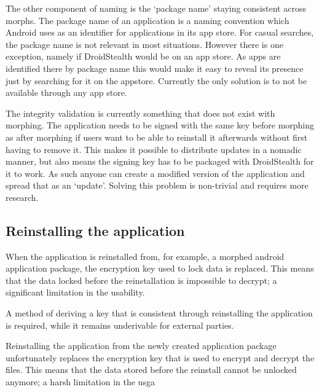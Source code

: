 The other component of naming is the `package name' staying consistent across morphs. 
The package name of an application is a naming convention which Android uses as an identifier for applications in its app store.
For casual searches, the package name is not relevant in most situations.
However there is one exception, namely if DroidStealth would be on an app store. 
As apps are identified there by package name this would make it easy to reveal its presence just by searching for it on the appstore.
Currently the only solution is to not be available through any app store.

The integrity validation is currently something that does not exist with morphing. 
The application needs to be signed with the same key before morphing as after morphing if users want to be able to reinstall it afterwards without first having to remove it. 
This makes it possible to distribute updates in a nomadic manner, but also means the signing key has to be packaged with DroidStealth for it to work. 
As such anyone can create a modified version of the application and spread that as an `update'.
Solving this problem is non-trivial and requires more research.

\subsection{Reinstalling the application}
When the application is reinstalled from, for example, a morphed android application package, the encryption key used to lock data is replaced.
This means that the data locked before the reinstallation is impossible to decrypt; a significant limitation in the usability.

A method of deriving a key that is consistent through reinstalling the application is required, while it remains underivable for external parties.

Reinstalling the application from the newly created application package unfortunately replaces the encryption key that is used to encrypt and decrypt the files.
This means that the data stored before the reinstall cannot be unlocked anymore; a harsh limitation in the usga
